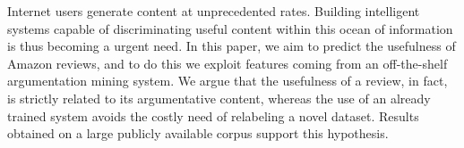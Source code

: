 Internet users generate content at unprecedented rates. Building intelligent systems capable of discriminating useful content within this ocean of information is thus becoming a urgent need. In this paper, we aim to predict the usefulness of Amazon reviews, and to do this we exploit features coming from an off-the-shelf argumentation mining system. We argue that the usefulness of a review, in fact, is strictly related to its argumentative content, whereas the use of an already trained system avoids the costly need of relabeling a novel dataset. Results obtained on a large publicly available corpus support this hypothesis.
